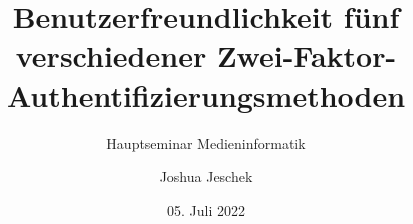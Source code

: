 \usepackage[T1]{fontenc}
\usepackage[utf8]{inputenc}
\usepackage[ngerman]{babel}
\usepackage{tikz} %
\usepackage{enotez} %
\usepackage[nobiblatex]{xurl} %
\usepackage{pgfplotstable} %

\usepackage{nameref}
\makeatletter
\newcommand*{\currentsectionname}{\@currentlabelname}
\makeatother



\graphicspath{ {./images/} }

\nocite{*}


\newcommand{\Title}{Benutzerfreundlichkeit fünf verschiedener Zwei-Faktor-Authentifizierungsmethoden}
\newcommand{\ShortTitle}{Zwei-Faktor-Authentifizierungsmethoden}
\title[\ShortTitle]{\Title}
\subtitle{Hauptseminar Medieninformatik}
\author{Joshua Jeschek}
\date{05. Juli 2022}



\tucthreeheadlines{}
\begin{frame}
    \titlepage{}


\end{frame}

